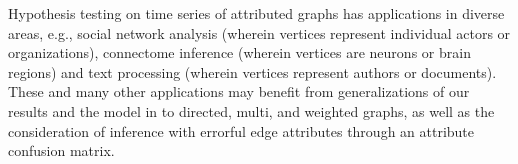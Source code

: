 \documentclass[10pt,journal,compsoc]{IEEEtran}
\theoremstyle{definition}
\begin{document}
Hypothesis testing on time series of attributed graphs has
applications in diverse areas, e.g., social network analysis (wherein
vertices represent individual actors or organizations), connectome
inference (wherein vertices are neurons or brain regions) and text
processing (wherein vertices represent authors or documents). These
and many other applications may benefit from generalizations of our
results and the model in \cite{lee11} to directed, multi, and weighted
graphs, as well as the consideration of inference with errorful edge
attributes through an attribute confusion matrix.
  
\end{document}
